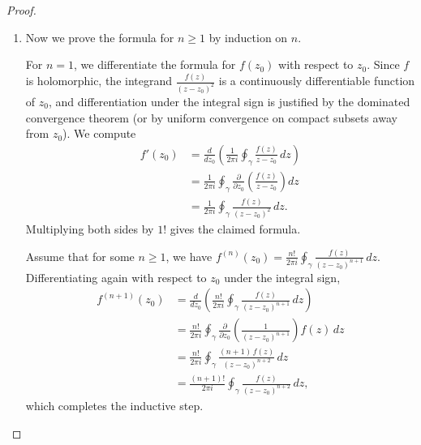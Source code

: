 \begin{proof}
\begin{enumerate}
        \item Now we prove the formula for $n \geq 1$ by induction on $n$.

        For $n = 1$, we differentiate the formula for $f(z_0)$ with respect to $z_0$. Since $f$ is holomorphic, the integrand $\frac{f(z)}{(z - z_0)^2}$ is a continuously differentiable function of $z_0$, and differentiation under the integral sign is justified by the dominated convergence theorem (or by uniform convergence on compact subsets away from $z_0$). We compute
        \begin{align*}
            f'(z_0) &= \frac{d}{dz_0} \left( \frac{1}{2\pi i} \oint_{\gamma} \frac{f(z)}{z - z_0}\,dz \right) \\
            &= \frac{1}{2\pi i} \oint_{\gamma} \frac{\partial}{\partial z_0} \left( \frac{f(z)}{z - z_0} \right) dz \\
            &= \frac{1}{2\pi i} \oint_{\gamma} \frac{f(z)}{(z - z_0)^2}\,dz.
        \end{align*}
        Multiplying both sides by $1!$ gives the claimed formula.

        Assume that for some $n \geq 1$, we have $f^{(n)}(z_0) = \frac{n!}{2\pi i} \oint_{\gamma} \frac{f(z)}{(z - z_0)^{n+1}}\,dz$. Differentiating again with respect to $z_0$ under the integral sign,
        \begin{align*}
            f^{(n+1)}(z_0) &= \frac{d}{dz_0} \left( \frac{n!}{2\pi i} \oint_{\gamma} \frac{f(z)}{(z - z_0)^{n+1}}\,dz \right) \\
            &= \frac{n!}{2\pi i} \oint_{\gamma} \frac{\partial}{\partial z_0} \left( \frac{1}{(z - z_0)^{n+1}} \right) f(z)\,dz \\
            &= \frac{n!}{2\pi i} \oint_{\gamma} \frac{(n+1)\,f(z)}{(z - z_0)^{n+2}}\,dz \\
            &= \frac{(n+1)!}{2\pi i} \oint_{\gamma} \frac{f(z)}{(z - z_0)^{n+2}}\,dz,
        \end{align*}
        which completes the inductive step.
    \end{enumerate}
\end{proof}